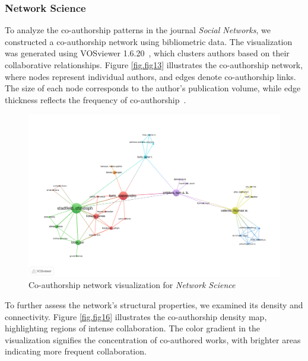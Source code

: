 \documentclass[twocolumn]{article}
\begin{document}
		\subsubsection*{Network Science}
		
		To analyze the co-authorship patterns in the journal \textit{Social Networks}, we constructed a co-authorship network using bibliometric data. The visualization was generated using VOSviewer 1.6.20~\cite{vanEck2010vosviewer}, which clusters authors based on their collaborative relationships. Figure \ref{fig.fig13} illustrates the co-authorship network, where nodes represent individual authors, and edges denote co-authorship links. The size of each node corresponds to the author's publication volume, while edge thickness reflects the frequency of co-authorship~\cite{glanzel2004handbook, newman2004coauthorship}.
		
		
		\begin{figure}[htbp]
			\centering
			\includegraphics[width=\columnwidth]{Network Science/VOS/co-authorship.pdf}
			\caption{Co-authorship network visualization for \textit{Network Science}}
			\label{fig.fig15}
		\end{figure}
		
		To further assess the network’s structural properties, we examined its density and connectivity. Figure \ref{fig.fig16} illustrates the co-authorship density map, highlighting regions of intense collaboration. The color gradient in the visualization signifies the concentration of co-authored works, with brighter areas indicating more frequent collaboration.
		
\end{document}
